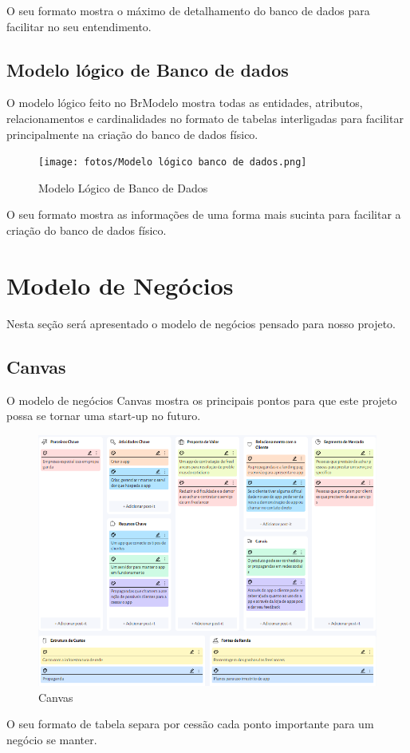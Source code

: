 \documentclass[
  a4paper,%
  12pt,%
  english,%
  brazilian,%
]{article}
\begin{document}
    O seu formato mostra o máximo de detalhamento do banco de dados para facilitar no seu entendimento.

\break

\subsection*{Modelo lógico de Banco de dados}

    O modelo lógico feito no BrModelo mostra todas as entidades, atributos, relacionamentos e cardinalidades no formato de tabelas interligadas para facilitar principalmente na criação do banco de dados físico.

\begin{figure}[h]
\centering
\caption{Modelo Lógico de Banco de Dados}%
\label{fig:diagrama-objetos}
 \texttt{[image: fotos/Modelo lógico banco de dados.png]}
\end{figure}

    O seu formato mostra as informações de uma forma mais sucinta para facilitar a criação do banco de dados físico.

\break

\section*{Modelo de Negócios}
    Nesta seção será apresentado o modelo de negócios pensado para nosso projeto.


\subsection*{Canvas}

    O modelo de negócios Canvas mostra os principais pontos para que este projeto possa se tornar uma start-up no futuro.

\begin{figure}[h]
\centering
\caption{Canvas}%
\label{fig:diagrama-objetos}
 \includegraphics[width=1\textwidth]{fotos/canvas.png}
\end{figure}

    O seu formato de tabela separa por cessão cada ponto importante para um negócio se manter.
\end{document}
